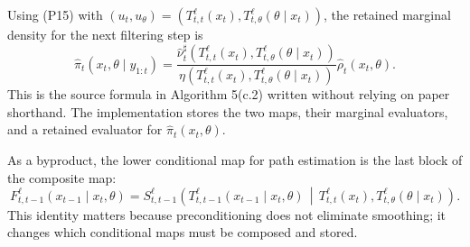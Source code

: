 \documentclass[11pt]{article}
\begin{document}
Using (P15) with
\((u_t,u_\theta)=
(T_{t,t}^{\ell}(x_t),T_{t,\theta}^{\ell}(\theta\mid x_t))\), the retained
marginal density for the next filtering step is
\[
    \widehat\pi_t(x_t,\theta\mid y_{1:t})
    =
    \frac{
    \widehat\nu_t^\sharp\!\left(
    T_{t,t}^{\ell}(x_t),
    T_{t,\theta}^{\ell}(\theta\mid x_t)
    \right)}
    {
    \eta\!\left(
    T_{t,t}^{\ell}(x_t),
    T_{t,\theta}^{\ell}(\theta\mid x_t)
    \right)}
    \widehat\rho_t(x_t,\theta).
    \tag{P17}
\]
This is the source formula in Algorithm 5(c.2) written without relying on
paper shorthand.  The implementation stores the two maps, their marginal
evaluators, and a retained evaluator for \(\widehat\pi_t(x_t,\theta)\).

As a byproduct, the lower conditional map for path estimation is the last block
of the composite map:
\[
    F_{t,t-1}^{\ell}(x_{t-1}\mid x_t,\theta)
    =
    S_{t,t-1}^{\ell}
    \!\left(
    T_{t,t-1}^{\ell}(x_{t-1}\mid x_t,\theta)
    \,\middle|\,
    T_{t,t}^{\ell}(x_t),
    T_{t,\theta}^{\ell}(\theta\mid x_t)
    \right).
    \tag{P18}
\]
This identity matters because preconditioning does not eliminate smoothing; it
changes which conditional maps must be composed and stored.

\begin{center}
\end{center}
\end{document}
